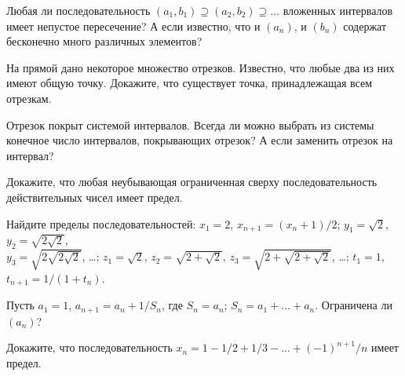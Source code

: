 \documentclass[a4paper, 11pt]{article}
\begin{document}
Любая ли последовательность $(a_1,b_1)\supseteq(a_2,b_2) \supseteq
\dots$
вложенных интервалов имеет непустое пересечение?
А если известно, что
и %
$(a_n)$, и
$(b_n)$
содержат бесконечно много различных элементов?

 На прямой дано некоторое множество отрезков.
Известно, что любые два из них имеют общую точку.
Докажите, что существует точка, принадлежащая всем отрезкам.





Отрезок покрыт системой интервалов.
Всегда ли можно выбрать из системы конечное число интервалов,
покрывающих отрезок?
А если заменить отрезок на интервал?



Докажите, что любая
неубывающая ограниченная сверху последовательность
действительных чисел имеет предел.

 Найдите пределы %
последовательностей:
 $x_1=2$, $x_{n+1}=(x_n+1)/2$;
 $y_1=\sqrt2$, $y_2=\sqrt{2\sqrt2}$,\\
$y_3=\sqrt{2\sqrt{2\sqrt2}}$, \dots; %
{} $z_1=\sqrt2$, $z_2=\sqrt{2+\sqrt2}$,
$z_3=\sqrt{2+\sqrt{2+\sqrt2}}$, \dots; %
{} $t_1=1$, $t_{n+1}=1/(1+t_n)$.


Пусть $a_1=1$, $a_{n+1}=a_n + 1/S_n$,  где
 $S_n=a_n$;
 $S_n=a_1+\dots+a_n$.
Ограничена ли %
$(a_n)$?

Докажите, что последовательность
$\displaystyle{x_n=1-1/2+1/3-...+(-1)^{n+1}/n}$
имеет предел.


\end{document}
